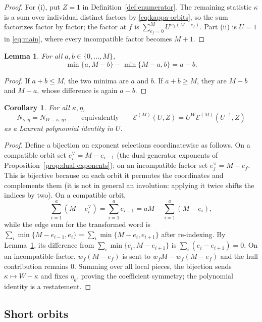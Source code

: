 \documentclass[11pt,a4paper]{article}
\newcommand{\Epoly}{\mathscr E}
\numberwithin{equation}{section}
\theoremstyle{plain}
\newtheorem{lemma}[theorem]{Lemma}
\newtheorem{corollary}[theorem]{Corollary}
\theoremstyle{definition}
\theoremstyle{remark}
\begin{document}
\begin{proof}
For (i), put $Z=1$ in Definition~\ref{def:enumerator}.  The remaining statistic
$\kappa$ is a sum over individual distinct factors by
\eqref{eq:kappa-orbits}, so the sum factorizes factor by factor; the factor at
$f$ is $\sum_{e_f=0}^{M}U^{w_f(M-e_f)}$.  Part (ii) is $U=1$ in
\eqref{eq:main}, where every incompatible factor becomes $M+1$.
\end{proof}

\begin{lemma}\label{lem:telescoping}
For all $a,b\in\{0,\ldots,M\}$,
\[
\min\{a,M-b\}-\min\{M-a,b\}=a-b.
\]
\end{lemma}

\begin{proof}
If $a+b\leq M$, the two minima are $a$ and $b$.  If $a+b\geq M$, they are
$M-b$ and $M-a$, whose difference is again $a-b$.
\end{proof}

\begin{corollary}\label{cor:symmetry}
For all $\kappa,\eta$,
\[
N_{\kappa,\eta}=N_{W-\kappa,\eta},
\qquad\text{equivalently}\qquad
\Epoly^{(M)}(U,Z)=U^W\Epoly^{(M)}(U^{-1},Z)
\]
as a Laurent polynomial identity in $U$.
\end{corollary}

\begin{proof}
Define a bijection on exponent selections coordinatewise as follows.  On a
compatible orbit set $e_i^\vee=M-e_{i-1}$ (the dual-generator exponents of
Proposition~\ref{prop:dual-exponents}); on an incompatible factor set
$e_f^\vee=M-e_f$.  This is bijective because on each orbit it permutes the
coordinates and complements them (it is not in general an involution: applying
it twice shifts the indices by two).  On a
compatible orbit,
\[
\sum_{i=1}^{a}(M-e_i^\vee)=\sum_{i=1}^{a}e_{i-1}
   =aM-\sum_{i=1}^{a}(M-e_i),
\]
while the edge sum for the transformed word is
$\sum_i\min\{M-e_{i-1},e_i\}
 =\sum_i\min\{M-e_i,e_{i+1}\}$ after re-indexing.  By
Lemma~\ref{lem:telescoping}, its difference from
$\sum_i\min\{e_i,M-e_{i+1}\}$ is $\sum_i(e_i-e_{i+1})=0$.  On an incompatible
factor, $w_f(M-e_f)$ is sent to $w_fM-w_f(M-e_f)$ and the hull contribution
remains $0$.  Summing over all local pieces, the bijection sends
$\kappa\mapsto W-\kappa$ and fixes $\eta_k$, proving the coefficient symmetry;
the polynomial identity is a restatement.
\end{proof}

\subsection{Short orbits}\label{sec:short-orbits}
\end{document}

